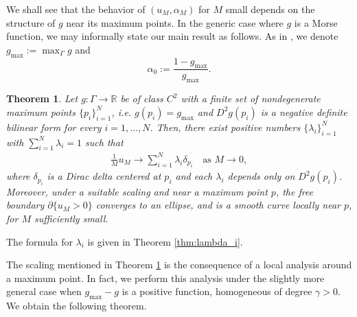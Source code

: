 \documentclass[10pt,a4paper]{article}
\newcommand{\gmax}{g_{\mathrm{max}}}
\newcommand{\RR}{\mathbb{R}}
\newcommand{\faskip}{\hspace{8pt}}
\newtheorem{mainthm}{Theorem}
\numberwithin{equation}{section}
\begin{document}
We shall see that the behavior of $ (u_M, \alpha_M) $ for $ M $ small depends on the structure of $ g $ near its maximum points. In the generic case where $ g $ is a Morse function, we may informally state our main result as follows. As in \cite{NRV20}, we denote $ \gmax := \max_{\Gamma} g $ and
\begin{equation}
\label{eq:alphazero}
	\alpha_0 := \frac{1 - \gmax}{\gmax}.
\end{equation}
\begin{mainthm}
	\label{mainthm:morse}
	Let $ g:\Gamma \rightarrow \RR $ be of class $ C^2 $ with a finite set of nondegenerate maximum points $ \{p_i\}_{i=1}^N $, i.e. $ g(p_i) = \gmax $ and $ D^2g(p_i) $ is a negative definite bilinear form for every $ i=1,\hdots,N $. Then, there exist positive numbers $ \{\lambda_i\}_{i=1}^N $ with $ \sum_{i=1}^{N} \lambda_i = 1 $ such that
	\begin{align*}
	\frac{1}{M}u_M \rightarrow \sum_{i=1}^{N} \lambda_i \delta_{p_i} \faskip \text{ as } M\rightarrow 0,
	\end{align*}
	where $ \delta_{p_i} $ is a Dirac delta centered at $ p_i $ and each $ \lambda_i $ depends only on $ D^2 g(p_i) $. Moreover, under a suitable scaling and near a maximum point $ p $, the free boundary $ \partial \{ u_M > 0\} $ converges to an ellipse, and is a smooth curve locally near $p$, for $ M $ sufficiently small.
\end{mainthm}

The formula for $ \lambda_i $ is given in Theorem \ref{thm:lambda_i}. 

The scaling mentioned in Theorem \ref{mainthm:morse} is the consequence of a local analysis around a maximum point. In fact, we perform this analysis under the slightly more general case when $\gmax - g$ is a positive function, homogeneous of degree $\gamma > 0$. We obtain the following theorem.
\end{document}
